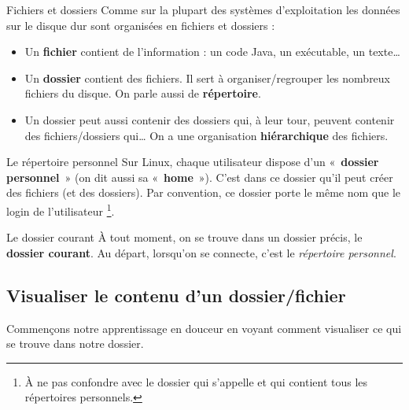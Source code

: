\documentclass[a4paper,11pt]{style-esi/td}
\begin{document}
		\begin{theorie}{Fichiers et dossiers}
			Comme sur la plupart des systèmes d'exploitation 
			les données sur le disque dur 
			sont organisées en fichiers et dossiers :
			\begin{itemize}
			\item 
				Un \textbf{fichier} contient de l'information : 
				un code Java, un exécutable, un texte\dots{}
			\item 
				Un \textbf{dossier} contient des fichiers. 
				Il sert à organiser/regrouper les nombreux fichiers du disque. 
				On parle aussi de \textbf{répertoire}.
			\item 
				Un dossier peut aussi contenir des dossiers qui, à leur tour, 
				peuvent contenir des fichiers/dossiers qui\dots{}
				On a une organisation \textbf{hiérarchique} des fichiers.
			\end{itemize}
		\end{theorie}

		\begin{theorie}{Le répertoire personnel}
			Sur Linux, chaque utilisateur dispose d'un « \textbf{dossier personnel} » 
			(on dit aussi sa « \textbf{home} »). 
			C'est dans ce dossier qu'il peut créer des fichiers (et des dossiers). 
			Par convention, ce dossier porte le même nom que le login de l'utilisateur%
			\footnote{%
				À ne pas confondre avec le dossier qui s'appelle 
				et qui contient tous les répertoires personnels.
			}.
		\end{theorie}

		\begin{theorie}{Le dossier courant}
			À tout moment,
			on se trouve dans un dossier précis, le \og{}\textbf{dossier courant}\fg{}. 
			Au départ, lorsqu'on se connecte, c’est le \emph{répertoire personnel}.
		\end{theorie}

	\subsection{Visualiser le contenu d'un dossier/fichier}

		Commençons notre apprentissage en douceur
		en voyant comment visualiser ce qui se trouve dans notre dossier.
\end{document}

